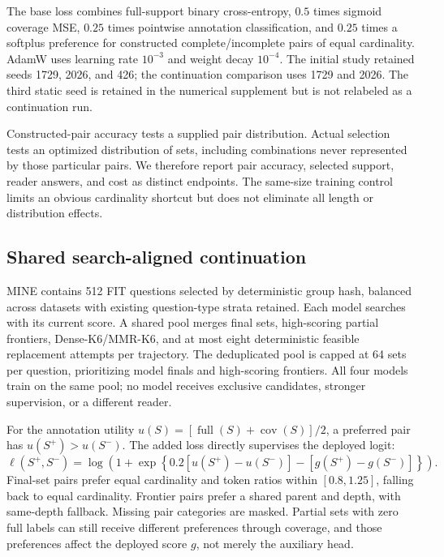 \documentclass[preprint,12pt]{elsarticle}
\newcommand{\cov}{\operatorname{cov}}
\newcommand{\full}{\operatorname{full}}
\begin{document}
The base loss combines full-support binary cross-entropy, $0.5$ times sigmoid coverage MSE, $0.25$ times pointwise annotation classification, and $0.25$ times a softplus preference for constructed complete/incomplete pairs of equal cardinality. AdamW uses learning rate $10^{-3}$ and weight decay $10^{-4}$. The initial study retained seeds 1729, 2026, and 426; the continuation comparison uses 1729 and 2026. The third static seed is retained in the numerical supplement but is not relabeled as a continuation run.

Constructed-pair accuracy tests a supplied pair distribution. Actual selection tests an optimized distribution of sets, including combinations never represented by those particular pairs. We therefore report pair accuracy, selected support, reader answers, and cost as distinct endpoints. The same-size training control limits an obvious cardinality shortcut but does not eliminate all length or distribution effects.

\subsection{Shared search-aligned continuation}
MINE contains 512 FIT questions selected by deterministic group hash, balanced across datasets with existing question-type strata retained. Each model searches with its current score. A shared pool merges final sets, high-scoring partial frontiers, Dense-K6/MMR-K6, and at most eight deterministic feasible replacement attempts per trajectory. The deduplicated pool is capped at 64 sets per question, prioritizing model finals and high-scoring frontiers. All four models train on the same pool; no model receives exclusive candidates, stronger supervision, or a different reader.

For the annotation utility $u(S)=[\full(S)+\cov(S)]/2$, a preferred pair has $u(S^+)>u(S^-)$. The added loss directly supervises the deployed logit:
\begin{equation}\label{eq:pref}
\ell(S^+,S^-)=\log\left(1+\exp\left\{0.2[u(S^+)-u(S^-)]-[g(S^+)-g(S^-)]\right\}\right).
\end{equation}
Final-set pairs prefer equal cardinality and token ratios within $[0.8,1.25]$, falling back to equal cardinality. Frontier pairs prefer a shared parent and depth, with same-depth fallback. Missing pair categories are masked. Partial sets with zero full labels can still receive different preferences through coverage, and those preferences affect the deployed score $g$, not merely the auxiliary head.
\end{document}
